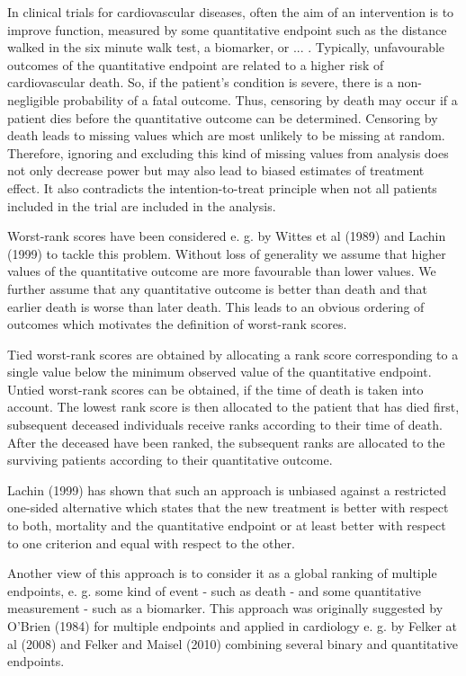 \documentclass[bimj,fleqn]{w-art}\usepackage[]{graphicx}\usepackage[]{color}
\theoremstyle{plain}
\theoremstyle{definition}
\begin{document}
  In clinical trials for cardiovascular diseases, often the aim of an
  intervention is to improve function, measured by some quantitative endpoint
  such as the distance walked in the six minute walk test, a biomarker, or ... .
  Typically, unfavourable outcomes of the quantitative endpoint are related to a
  higher risk of cardiovascular death. So, if the patient's condition is severe,
  there is a non-negligible probability of a fatal outcome. Thus, censoring by
  death may occur if a patient dies before the quantitative outcome can be
  determined. Censoring by death leads to missing values which are most unlikely
  to be missing at random. Therefore, ignoring and excluding this kind of
  missing values from analysis does not only decrease power but may also lead to
  biased estimates of treatment effect. It also contradicts the
  intention-to-treat principle when not all patients included in the trial are
  included in the analysis.

  Worst-rank scores have been considered e. g. by Wittes et al (1989) and Lachin
  (1999) to tackle this problem. Without loss of generality we assume that
  higher values of the quantitative outcome are more favourable than lower
  values. We further assume that any quantitative outcome is better than death
  and that earlier death is worse than later death. This leads to an obvious
  ordering of outcomes which motivates the definition of worst-rank scores.

  Tied worst-rank scores are obtained by allocating a rank score corresponding
  to a single value below the minimum observed value of the quantitative
  endpoint. Untied worst-rank scores can be obtained, if the time of death is
  taken into account. The lowest rank score is then allocated to the patient
  that has died first, subsequent deceased individuals receive ranks according
  to their time of death. After the deceased have been ranked, the subsequent
  ranks are allocated to the surviving patients according to their quantitative
  outcome.

  Lachin (1999) has shown that such an approach is unbiased against a restricted
  one-sided alternative which states that the new treatment is better with
  respect to both, mortality and the quantitative endpoint or at least better
  with respect to one criterion and equal with respect to the other.

  Another view of this approach is to consider it as a global ranking of
  multiple endpoints, e. g. some kind of event - such as death - and some
  quantitative measurement - such as a biomarker. This approach was originally
  suggested by O'Brien (1984) for multiple endpoints and applied in cardiology
  e. g. by Felker at al (2008) and Felker and Maisel (2010) combining several
  binary and quantitative endpoints.
\end{document}
